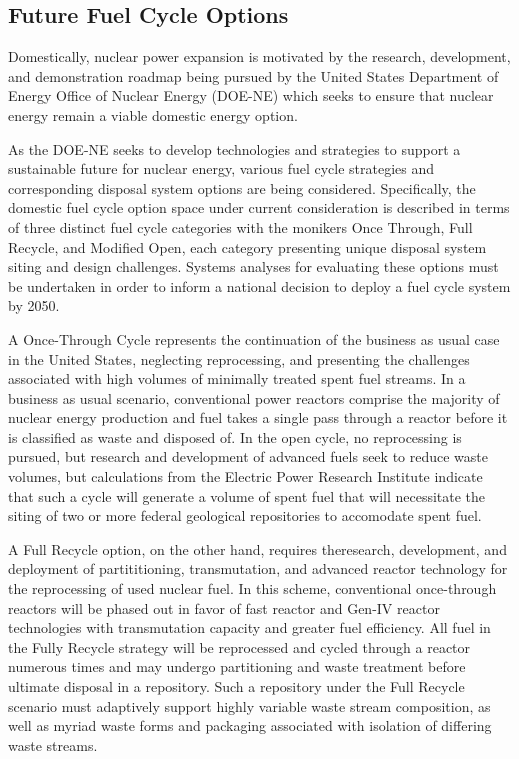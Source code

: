 \subsection{Future Fuel Cycle Options}

Domestically, nuclear power expansion is motivated by the research, development, and demonstration 
roadmap being pursued by the United States Department of Energy Office of Nuclear Energy (DOE-NE) 
which seeks to ensure that nuclear energy remain a viable domestic energy option.  
\cite{DOE-NE_roadmap} 

As the DOE-NE seeks to develop technologies and strategies to support a sustainable future for 
nuclear energy, various fuel cycle strategies and corresponding disposal system options are being 
considered. Specifically, the domestic fuel cycle option space under current consideration is 
described in terms of three distinct fuel cycle categories with the monikers Once Through, Full 
Recycle, and Modified Open, each category presenting unique disposal system siting and design 
challenges. Systems analyses for evaluating these options must be undertaken in order to inform a 
national decision to deploy a fuel cycle system by 2050. \cite{DOE-NE_roadmap} 

A Once-Through Cycle represents the continuation of the business as usual case in the United States,  
neglecting reprocessing, and presenting the challenges associated with high volumes of minimally 
treated spent fuel streams.  In a business as usual scenario, conventional power reactors comprise 
the majority of nuclear energy production and fuel takes a single pass through a reactor before it 
is classified as waste and disposed of. In the open cycle, no reprocessing is pursued, but research 
and development of advanced fuels seek to reduce waste volumes, but calculations from the Electric 
Power Research Institute indicate that such a cycle will generate a volume of spent fuel that will 
necessitate the siting of two or more federal  geological repositories to accomodate spent fuel.  
\cite{Room_at_the_mountain} 

A Full Recycle option, on the other hand, requires theresearch, development, and deployment of 
partititioning, transmutation, and advanced reactor technology for the reprocessing of used nuclear 
fuel.  In this scheme, conventional once-through reactors will be phased out in favor of fast 
reactor and Gen-IV reactor technologies with transmutation capacity and greater fuel efficiency. All 
fuel in the Fully Recycle strategy will be reprocessed and cycled through a reactor numerous times 
and may undergo partitioning and waste treatment before ultimate disposal in a repository. Such a 
repository under the Full Recycle scenario must adaptively support highly variable waste stream 
composition, as well as myriad waste forms and packaging associated with isolation of differing 
waste streams.

